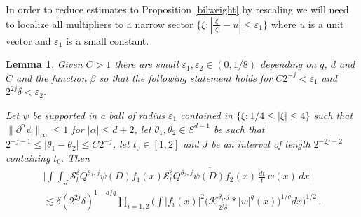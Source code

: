 \documentclass[11pt]{amsart}
\newtheorem{lemma}[theorem]{Lemma}
\theoremstyle{definition}
\numberwithin{theorem}{section}
\numberwithin{definition}{section}
\newcommand{\note}[1]{\footnote{\texttt{\Small #1}}}
\def\lc{\lesssim}
\def\eps{\varepsilon}
\def\cK{{\mathcal {K}}}
\def\cS{{\mathcal {S}}}
\begin{document}
In order to reduce estimates  to
Proposition \ref{bilweight} by rescaling
 we will need  to localize all multipliers
to a narrow sector $\{\xi:
|\tfrac{\xi}{|\xi|}-u|\le \eps_1 \}$
where $u$ is a unit vector
and $\eps_1$ is a small constant.
\begin{lemma} \label{scaledbil}
Given $C>1$
 there are small $\eps_1,\eps_2\in (0,1/8)$  depending on $q$, $d$ and $C$ and the function $\beta$
so that the following statement holds for $C2^{-j}<\eps_1$ and
$2^{2j}\delta<\eps_2$.

Let   $\psi$  be
supported in a ball of radius $\eps_1$ contained in $\{\xi:1/4\le|\xi|\le 4\}$
such that
 $\|\partial^\alpha \psi\|_\infty\le 1$
for $|\alpha|\le d+2$, let $\theta_1, \theta_2 \in  S^{d-1}$ be
 such that $2^{-j-1}\le |\theta_1-\theta_2|\le
C 2^{-j}$, let
$t_0\in[1,2]$ and $J$ be an interval of length $2^{-2j-2}$ containing $t_0$.
 Then
\begin{multline*}
\Big|\int\int_{J}
\cS_t^\delta  Q^{\theta_1,j} \psi (D)f_1(x)
\overline
{\cS_t^\delta  Q^{\theta_2,j} \psi (D)f_2(x)}\, \frac{dt}{t}\, w(x)\,dx \Big|
\\
\lc \delta (2^{2j}\delta)^{1- d/q}
\prod_{i=1,2} \Big( \int |f_i(x)|^2 \big(\cK^{\theta_i,j}_{2^j\delta} *|w|^q(x)\big)^{1/q} dx\Big)^{1/2}\,.
\end{multline*}
\end{lemma}
\end{document}
